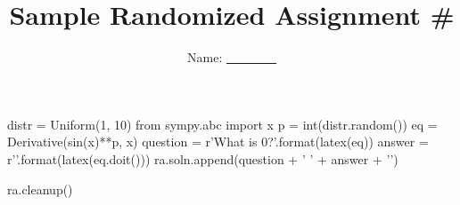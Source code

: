 \documentclass{article}
\title{Sample Randomized Assignment \#}
\author{Name: \underline{~~~~~~~~}}
\begin{document}
\maketitle

\begin{sympycode}
distr = Uniform(1, 10)
from sympy.abc import x
p = int(distr.random())
eq = Derivative(sin(x)**p, x)
question = r'What is ${0}$?'.format(latex(eq))
answer = r''.format(latex(eq.doit()))
ra.soln.append(question + ' ' + answer + '\n')
\end{sympycode}


\begin{sympycode}
ra.cleanup()
\end{sympycode}
\end{document}
